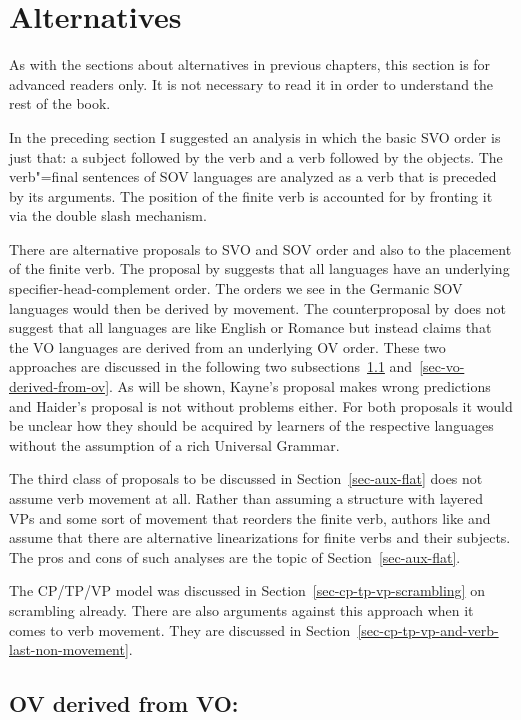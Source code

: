 \section{Alternatives}

As with the sections about alternatives in previous chapters, this section is for advanced readers
only. It is not necessary to read it in order to understand the rest of the book.

In the preceding section I suggested an analysis in which the basic SVO order is just that: a
subject followed by the verb and a verb followed by the objects. The verb"=final sentences of SOV
languages are analyzed as a verb that is preceded by its arguments. The position of the finite verb
is accounted for by fronting it via the double slash mechanism.

There are alternative proposals to SVO and SOV order and also to the placement of the finite
verb. The proposal by \citet{Kayne94a-u} suggests that all languages have an underlying
specifier-head-complement order. The orders we see in the Germanic SOV languages would then be
derived by movement. The counterproposal by \citet{Haider2000a,Haider2020a} does not suggest that all languages are
like English or Romance but instead claims that the VO languages are derived from an underlying OV
order. These two approaches are discussed in the following two subsections~\ref{sec-ov-derived-from-vo} and~\ref{sec-vo-derived-from-ov}. As will be shown,
Kayne's proposal makes wrong predictions and Haider's proposal is not without problems either. For
both proposals it would be unclear how they should be acquired by learners of the respective
languages without the assumption of a rich Universal Grammar.

The third class of proposals to be discussed in Section~\ref{sec-aux-flat} does not assume verb movement at
all. Rather than assuming a structure with layered VPs and some sort of movement that reorders the
finite verb, authors like \citet*{GKPS85a} and \citet{Sag2020a} assume that there are alternative
linearizations for finite verbs and their subjects. The pros and cons of such analyses are the topic
of Section~\ref{sec-aux-flat}.

The CP/TP/VP model was discussed in Section~\ref{sec-cp-tp-vp-scrambling} on scrambling already. 
There are also arguments against this approach when it comes to verb movement. They are discussed in
Section~\ref{sec-cp-tp-vp-and-verb-last-non-movement}.  

\subsection{OV derived from VO: \citet{Kayne94a-u}}
\label{sec-ov-derived-from-vo}



